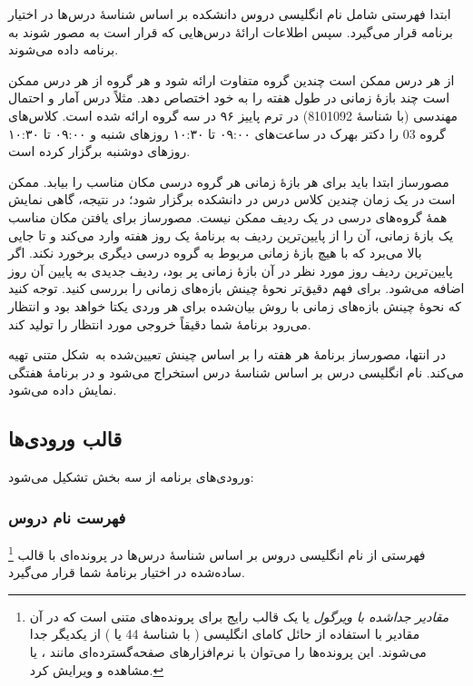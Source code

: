\documentclass{utap}
\begin{document}
    ابتدا فهرستی شامل نام انگلیسی دروس دانشکده بر اساس شناسهٔ درس‌ها در اختیار برنامه قرار می‌گیرد. سپس اطلاعات ارائهٔ درس‌هایی که قرار است به مصور شوند به برنامه داده می‌شوند.

    از هر درس ممکن است چندین گروه متفاوت ارائه شود و هر گروه از هر درس ممکن است چند بازهٔ زمانی در طول هفته را به خود اختصاص دهد. مثلاً درس آمار و احتمال مهندسی (با شناسهٔ 8101092) در ترم پاییز ۹۶ در سه گروه ارائه شده است. کلاس‌های گروه 03 را دکتر بهرک در ساعت‌های ۰۹:۰۰ تا ۱۰:۳۰ روزهای شنبه و ۰۹:۰۰ تا ۱۰:۳۰ روزهای دوشنبه برگزار کرده است.

    مصورساز ابتدا باید برای هر بازهٔ زمانی هر گروه درسی مکان مناسب را بیابد. ممکن است در یک زمان چندین کلاس درس در دانشکده برگزار شود؛ در نتیجه، گاهی نمایش همهٔ گروه‌های درسی در یک ردیف ممکن نیست. مصورساز برای یافتن مکان مناسب یک بازهٔ زمانی، آن را از پایین‌ترین ردیف به برنامهٔ یک روز هفته وارد می‌کند و تا جایی بالا می‌برد که با هیچ بازهٔ زمانی مربوط به گروه درسی دیگری برخورد نکند. اگر پایین‌ترین ردیف روز مورد نظر در آن بازهٔ زمانی پر بود، ردیف جدیدی به پایین آن روز اضافه می‌شود. برای فهم دقیق‌تر نحوهٔ چینش بازه‌‌های زمانی  را بررسی کنید. توجه کنید که نحوهٔ چینش بازه‌های زمانی با روش بیان‌شده برای هر وردی یکتا خواهد بود و انتظار می‌رود برنامهٔ شما دقیقاً خروجی مورد انتظار را تولید کند.

    در انتها، مصورساز برنامهٔ هر هفته را بر اساس چینش تعیین‌شده به~شکل متنی تهیه می‌کند. نام انگلیسی درس بر اساس شناسهٔ درس استخراج می‌شود و در برنامهٔ هفتگی نمایش داده می‌شود.

    \subsection{قالب ورودی‌ها}

    ورودی‌های برنامه از سه بخش تشکیل می‌شود:

    \subsubsection{فهرست نام دروس}

    فهرستی از نام انگلیسی دروس بر اساس شناسهٔ  درس‌ها در پرونده‌ای با قالب \footnote{\textit{مقادیر جداشده با ویرگول} یا  یک قالب رایج برای پرونده‌های متنی است که در آن مقادیر با استفاده از حائل کامای انگلیسی (\lr{\texttt{,}} با شناسهٔ  44 یا ) از یکدیگر جدا می‌شوند. این پرونده‌ها را می‌توان با نرم‌افزارهای صفحه‌گسترده‌ای مانند ،  یا  مشاهده و ویرایش کرد.} ساده‌شده در اختیار برنامهٔ شما قرار می‌گیرد.
\end{document}
